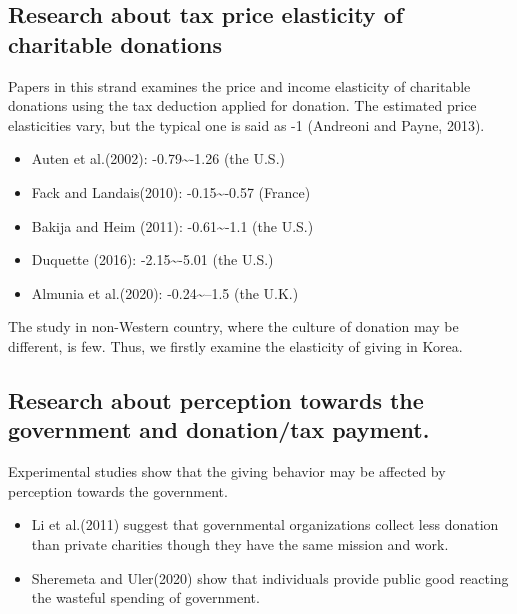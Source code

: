 \documentclass[ review  , 3p ]{elsarticle}
\providecommand{\tightlist}{%
  \setlength{\itemsep}{0pt}\setlength{\parskip}{0pt}}
\begin{document}
  \hypertarget{research-about-tax-price-elasticity-of-charitable-donations}{%
  \subsection{Research about tax price elasticity of charitable donations}\label{research-about-tax-price-elasticity-of-charitable-donations}}

  Papers in this strand examines the price and income elasticity of charitable donations using the tax deduction applied for donation.
  The estimated price elasticities vary, but the typical one is said as -1 (Andreoni and Payne, 2013).

  \begin{itemize}
  \tightlist
  \item
    Auten et al.(2002): -0.79\textasciitilde-1.26 (the U.S.)
  \item
    Fack and Landais(2010): -0.15\textasciitilde-0.57 (France)
  \item
    Bakija and Heim (2011): -0.61\textasciitilde-1.1 (the U.S.)
  \item
    Duquette (2016): -2.15\textasciitilde-5.01 (the U.S.)
  \item
    Almunia et al.(2020): -0.24\textasciitilde--1.5 (the U.K.)
  \end{itemize}

  The study in non-Western country, where the culture of donation may be different, is few.
  Thus, we firstly examine the elasticity of giving in Korea.

  \hypertarget{research-about-perception-towards-the-government-and-donationtax-payment.}{%
  \subsection{Research about perception towards the government and donation/tax payment.}\label{research-about-perception-towards-the-government-and-donationtax-payment.}}

  Experimental studies show that the giving behavior may be affected by perception towards the government.

  \begin{itemize}
  \tightlist
  \item
    Li et al.(2011) suggest that governmental organizations collect less donation than private charities though they have the same mission and work.
  \item
    Sheremeta and Uler(2020) show that individuals provide public good reacting the wasteful spending of government.
  \end{itemize}
\end{document}
